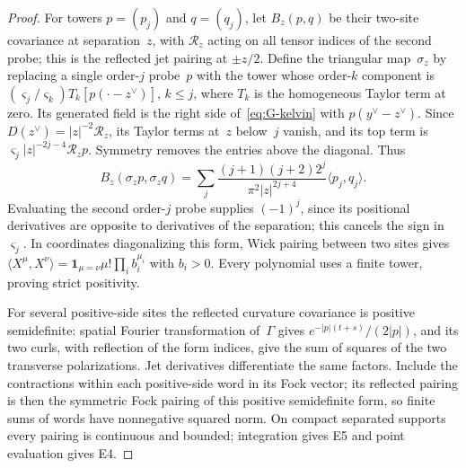 \begin{proof}
For towers $p=(p_j)$ and $q=(q_j)$, let $B_z(p,q)$ be their two-site covariance at separation~$z$, with $\mathcal R_z$ acting on all tensor indices of the second probe; this is the reflected jet pairing at $\pm z/2$. Define the triangular map~$\sigma_z$ by replacing a single order-$j$ probe~$p$ with the tower whose order-$k$ component is $(\varsigma_j/\varsigma_k)T_k[p(\cdot-z^\vee)]$, $k\le j$, where $T_k$ is the homogeneous Taylor term at zero. Its generated field is the right side of~\eqref{eq:G-kelvin} with $p(y^\vee-z^\vee)$. Since $D(z^\vee)=|z|^{-2}\mathcal R_z$, its Taylor terms at~$z$ below~$j$ vanish, and its top term is $\varsigma_j|z|^{-2j-4}\mathcal R_zp$. Symmetry removes the entries above the diagonal. Thus
\begin{equation}\label{eq:G-pivots}
B_z(\sigma_zp,\sigma_zq)
 =\sum_j\frac{(j+1)(j+2)2^j}{\pi^2|z|^{2j+4}}
 \langle p_j,q_j\rangle.
\end{equation}
Evaluating the second order-$j$ probe supplies $(-1)^j$, since its positional derivatives are opposite to derivatives of the separation; this cancels the sign in~$\varsigma_j$. In coordinates diagonalizing this form, Wick pairing between two sites gives $\langle X^\mu,X^\nu\rangle=\mathbf1_{\mu=\nu}\mu!\prod_i b_i^{\mu_i}$ with $b_i>0$. Every polynomial uses a finite tower, proving strict positivity.

For several positive-side sites the reflected curvature covariance is positive semidefinite: spatial Fourier transformation of~$\Gamma$ gives $e^{-|p|(t+s)}/(2|p|)$, and its two curls, with reflection of the form indices, give the sum of squares of the two transverse polarizations. Jet derivatives differentiate the same factors. Include the contractions within each positive-side word in its Fock vector; its reflected pairing is then the symmetric Fock pairing of this positive semidefinite form, so finite sums of words have nonnegative squared norm. On compact separated supports every pairing is continuous and bounded; integration gives E5 and point evaluation gives E4.


\end{proof}
